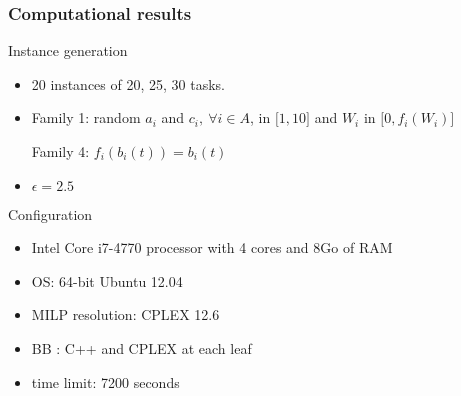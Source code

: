 \begin{frame}
  \frametitle{Computational results}
  \vfill
  \begin{block}{Instance generation}
    \begin{itemize}
    \item 20 instances of 20, 25, 30 tasks. 
    \item Family 1: random  $a_i$ and $c_i,\ \forall i \in A$, in ${[}1,10{]}$
      and $W_i$ in ${[}0,f_i(W_i){]}$

      Family 4: $f_i(b_i(t))= b_i(t)$
    \item $\epsilon = 2.5$ 
    \end{itemize}
  \end{block}
  \vfill
  \pause
  \begin{block}{Configuration}
    \begin{itemize}
    \item Intel Core i7-4770 processor with 4 cores and 8Go of RAM
    \item OS: 64-bit Ubuntu 12.04
    \item MILP resolution: CPLEX 12.6  
    \item BB : C++ and CPLEX at each leaf
    \item time limit: 7200 seconds
    \end{itemize}
  \end{block}
  \vfill
\end{frame}

